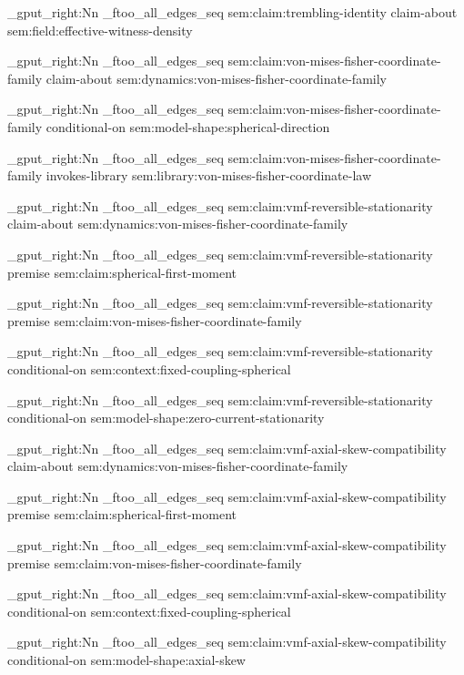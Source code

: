 \seq_gput_right:Nn \g_ftoo_all_edges_seq { { sem:claim:trembling-identity } { claim-about } { sem:field:effective-witness-density } }

\seq_gput_right:Nn \g_ftoo_all_edges_seq { { sem:claim:von-mises-fisher-coordinate-family } { claim-about } { sem:dynamics:von-mises-fisher-coordinate-family } }

\seq_gput_right:Nn \g_ftoo_all_edges_seq { { sem:claim:von-mises-fisher-coordinate-family } { conditional-on } { sem:model-shape:spherical-direction } }

\seq_gput_right:Nn \g_ftoo_all_edges_seq { { sem:claim:von-mises-fisher-coordinate-family } { invokes-library } { sem:library:von-mises-fisher-coordinate-law } }

\seq_gput_right:Nn \g_ftoo_all_edges_seq { { sem:claim:vmf-reversible-stationarity } { claim-about } { sem:dynamics:von-mises-fisher-coordinate-family } }

\seq_gput_right:Nn \g_ftoo_all_edges_seq { { sem:claim:vmf-reversible-stationarity } { premise } { sem:claim:spherical-first-moment } }

\seq_gput_right:Nn \g_ftoo_all_edges_seq { { sem:claim:vmf-reversible-stationarity } { premise } { sem:claim:von-mises-fisher-coordinate-family } }

\seq_gput_right:Nn \g_ftoo_all_edges_seq { { sem:claim:vmf-reversible-stationarity } { conditional-on } { sem:context:fixed-coupling-spherical } }

\seq_gput_right:Nn \g_ftoo_all_edges_seq { { sem:claim:vmf-reversible-stationarity } { conditional-on } { sem:model-shape:zero-current-stationarity } }

\seq_gput_right:Nn \g_ftoo_all_edges_seq { { sem:claim:vmf-axial-skew-compatibility } { claim-about } { sem:dynamics:von-mises-fisher-coordinate-family } }

\seq_gput_right:Nn \g_ftoo_all_edges_seq { { sem:claim:vmf-axial-skew-compatibility } { premise } { sem:claim:spherical-first-moment } }

\seq_gput_right:Nn \g_ftoo_all_edges_seq { { sem:claim:vmf-axial-skew-compatibility } { premise } { sem:claim:von-mises-fisher-coordinate-family } }

\seq_gput_right:Nn \g_ftoo_all_edges_seq { { sem:claim:vmf-axial-skew-compatibility } { conditional-on } { sem:context:fixed-coupling-spherical } }

\seq_gput_right:Nn \g_ftoo_all_edges_seq { { sem:claim:vmf-axial-skew-compatibility } { conditional-on } { sem:model-shape:axial-skew } }

